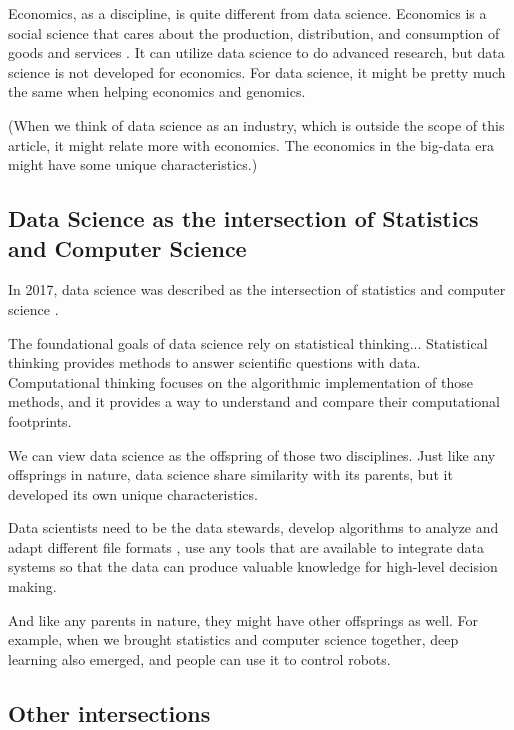 Economics, as a discipline, is quite different from data science.
Economics is a social science that cares about the production, distribution, and consumption of goods and services \cite{webster_economics}.
It can utilize data science to do advanced research, but data science is not developed for economics.
For data science, it might be pretty much the same when helping economics and genomics.

(When we think of data science as an industry, which is outside the scope of this article, it might relate more with economics. The economics in the big-data era might have some unique characteristics.)

\subsection*{Data Science as the intersection of Statistics and Computer Science}

In 2017, data science was described as the intersection of statistics and computer science \cite{blei_science_2017}.

\begin{displayquote}
The foundational goals of data science rely on statistical thinking...
Statistical thinking provides methods to answer scientific questions with data.
Computational thinking focuses on the algorithmic implementation of those methods, and it provides a way to understand and compare their computational footprints.
\end{displayquote}

We can view data science as the offspring of those two disciplines.
Just like any offsprings in nature, data science share similarity with its parents, but it developed its own unique characteristics.

Data scientists need to be the data stewards, develop algorithms to analyze and adapt different file formats \cite{mattmann_vision_2013}, use any tools that are available to integrate data systems so that the data can produce valuable knowledge for high-level decision making.

And like any parents in nature, they might have other offsprings as well. 
For example, when we brought statistics and computer science together, deep learning also emerged, and people can use it to control robots.

\subsection*{Other intersections}

